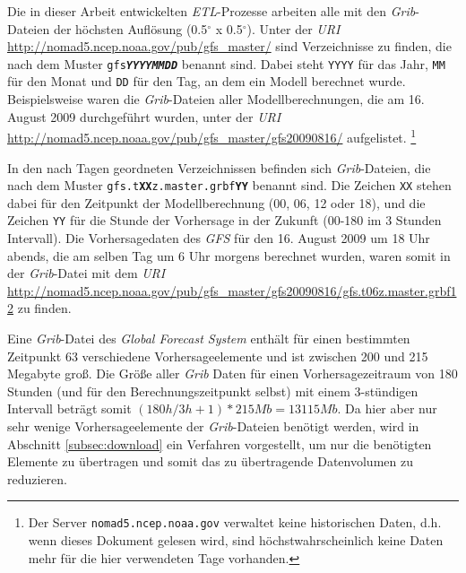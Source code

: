 Die in dieser Arbeit entwickelten \textit{ETL}-Prozesse arbeiten alle
mit den \textit{Grib}-Dateien der höchsten Auflösung (0.5$^{\circ}$ x
0.5$^{\circ}$). Unter der \textit{URI}
\url{http://nomad5.ncep.noaa.gov/pub/gfs_master/} sind Verzeichnisse
zu finden, die nach dem Muster \texttt{gfs\textbf{\textit{YYYYMMDD}}} benannt
sind. Dabei steht \texttt{YYYY} für das Jahr, \texttt{MM} für den
Monat und \texttt{DD} für den Tag, an dem ein Modell berechnet
wurde. Beispielsweise waren die \textit{Grib}-Dateien aller
Modellberechnungen, die am 16. August 2009 durchgeführt wurden, unter
der \textit{URI}
\url{http://nomad5.ncep.noaa.gov/pub/gfs_master/gfs20090816/}
aufgelistet.  \footnote{Der Server \texttt{nomad5.ncep.noaa.gov}
  verwaltet keine historischen Daten, d.h. wenn dieses Dokument
  gelesen wird, sind höchstwahrscheinlich keine Daten mehr für die
  hier verwendeten Tage vorhanden.}

In den nach Tagen geordneten Verzeichnissen befinden sich
\textit{Grib}-Dateien, die nach dem Muster
\texttt{gfs.t\textbf{XX}z.master.grbf\textbf{YY}} benannt sind. Die
Zeichen \texttt{XX} stehen dabei für den Zeitpunkt der
Modellberechnung (00, 06, 12 oder 18), und die Zeichen \texttt{YY} für
die Stunde der Vorhersage in der Zukunft (00-180 im 3 Stunden
Intervall). Die Vorhersagedaten des \textit{GFS} für den 16. August
2009 um 18 Uhr abends, die am selben Tag um 6 Uhr morgens berechnet
wurden, waren somit in der \textit{Grib}-Datei mit dem \textit{URI}
\url{http://nomad5.ncep.noaa.gov/pub/gfs_master/gfs20090816/gfs.t06z.master.grbf12}
zu finden.

Eine \textit{Grib}-Datei des \textit{Global Forecast System} enthält
für einen bestimmten Zeitpunkt 63 verschiedene Vorhersageelemente und
ist zwischen 200 und 215 Megabyte groß. Die Größe aller \textit{Grib}
Daten für einen Vorhersagezeitraum von 180 Stunden (und für den
Berechnungszeitpunkt selbst) mit einem 3-stündigen Intervall beträgt
somit $(180h / 3h + 1) * 215 Mb = 13115 Mb$. Da hier aber nur sehr
wenige Vorhersageelemente der \textit{Grib}-Dateien benötigt werden,
wird in Abschnitt \ref{subsec:download} ein Verfahren vorgestellt, um
nur die benötigten Elemente zu übertragen und somit das zu
übertragende Datenvolumen zu reduzieren.

